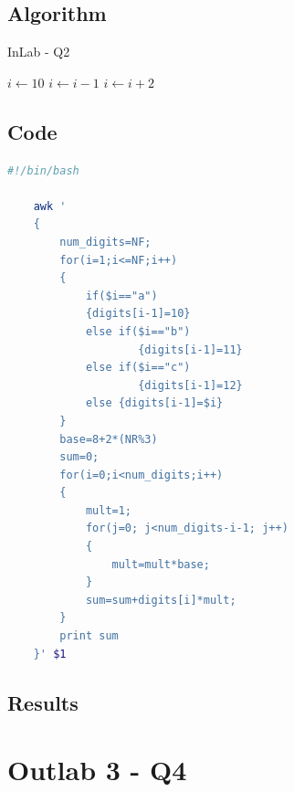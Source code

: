 \documentclass[12pt]{article}
\begin{document}
\subsection{Algorithm}
\begin{algorithm*}
    \label{Q2}
    \caption{InLab - Q2}\label{alg:Q2}
    $i\gets 10$\;
    {
        $i\gets i-1$\;
    }{
        {
            $i\gets i+2$\;
        }
    }
\end{algorithm*}
\newpage

\subsection{Code}
\begin{lstlisting}[language=bash, caption=InLab - Q2]
    #!/bin/bash

    awk '
    {
        num_digits=NF;
        for(i=1;i<=NF;i++)
        {
            if($i=="a")
            {digits[i-1]=10}
            else if($i=="b")
                    {digits[i-1]=11}
            else if($i=="c")
                    {digits[i-1]=12}
            else {digits[i-1]=$i}
        }
        base=8+2*(NR%3)
        sum=0;
        for(i=0;i<num_digits;i++)
        {
            mult=1;
            for(j=0; j<num_digits-i-1; j++)
            {
                mult=mult*base;
            }
            sum=sum+digits[i]*mult;
        }
        print sum
    }' $1
\end{lstlisting}
\newpage

\subsection{Results}
\newpage

\section{Outlab 3 - Q4}
\end{document}
